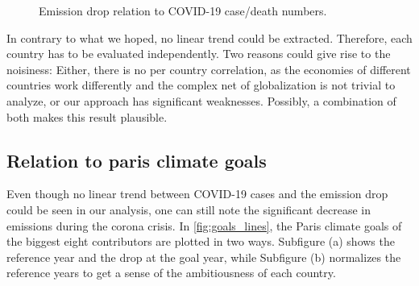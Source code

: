 \begin{figure}[h!]
	\centering
	\caption{Emission drop relation to COVID-19 case/death numbers.}
	\label{fig:emission_drop_over_normalized_deaths}
\end{figure}

In contrary to what we hoped, no linear trend could be extracted. Therefore, each country has to be evaluated independently. Two reasons could give rise to the noisiness: Either, there is no per country correlation, as the economies of different countries work differently and the complex net of globalization is not trivial to analyze, or our approach has significant weaknesses. Possibly, a combination of both makes this result plausible.

\subsection*{Relation to paris climate goals}

Even though no linear trend between COVID-19 cases and the \co emission drop could be seen in our analysis, one can still note the significant decrease in emissions during the corona crisis. In \autoref{fig:goals_lines}, the Paris climate goals of the biggest eight contributors are plotted in two ways. Subfigure (a) shows the reference year and the drop at the goal year, while Subfigure (b) normalizes the reference years to get a sense of the ambitiousness of each country.

